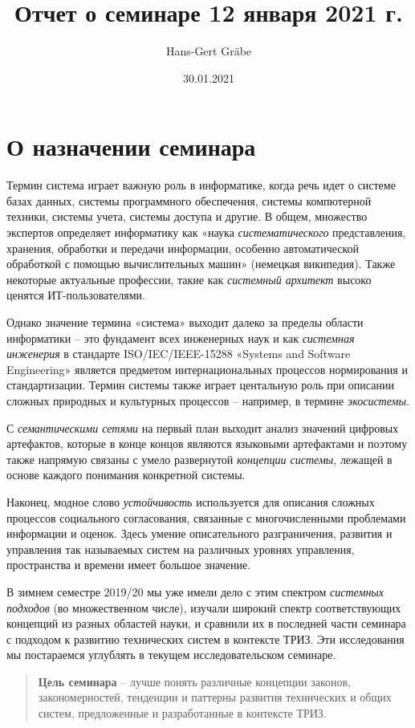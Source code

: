 \documentclass[a4paper,11pt]{article}
\author{Hans-Gert Gräbe}
\title{Отчет о семинаре 12 января 2021 г.}
\date{30.01.2021}
\begin{document}
\maketitle

\section{О назначении семинара}
Термин система играет важную роль в информатике, когда речь идет о системе
базах данных, системы программного обеспечения, системы компютерной техники,
системы учета, системы доступа и другие. В общем, множество экспертов
определяет информатику как «наука \emph{систематического} представления,
хранения, обработки и передачи информации, особенно автоматической обработкой
с помощью вычислительных машин» (немецкая википедия). Также некоторые
актуальные профессии, такие как \emph{системный архитект} высоко ценятся
ИТ-пользователями.

Однако значение термина «система» выходит далеко за пределы области
информатики -- это фундамент всех инженерных наук и как \emph{системная
  инженерия} в стандарте ISO/IEC/IEEE-15288 «Systems and Software Engineering»
является предметом интернациональных процессов нормирования и
стандартизации. Термин системы также играет центальную роль при описании
сложных природных и культурных процессов -- например, в термине
\emph{экосистемы}.

С \emph{семантическими сетями} на первый план выходит анализ значений цифровых
артефактов, которые в конце концов являются языковыми артефактами и поэтому
также напрямую связаны с умело развернутой \emph{концепции системы}, лежащей в
основе каждого понимания конкретной системы.

Наконец, модное слово \emph{устойчивость} используется для описания сложных
процессов социального согласования, связанные с многочисленными проблемами
информации и оценок. Здесь умение описательного разграничения, развития и
управления так называемых систем на различных уровнях управления, пространства
и времени имеет большое значение.

В зимнем семестре 2019/20 мы уже имели дело с этим спектром \emph{системных
  подходов} (во множественном числе), изучали широкий спектр соответствующих
концепций из разных областей науки, и сравнили их в последней части семинара с
подходом к развитию технических систем в контексте ТРИЗ. Эти исследования мы
постараемся углублять в текущем исследовательском семинаре.

\begin{quote}
  \textbf{Цель семинара} -- лучше понять различные концепции законов,
  закономерностей, тенденции и паттерны развития технических и общих систем,
  предложенные и разработанные в контексте ТРИЗ.
\end{quote}
\end{document}
